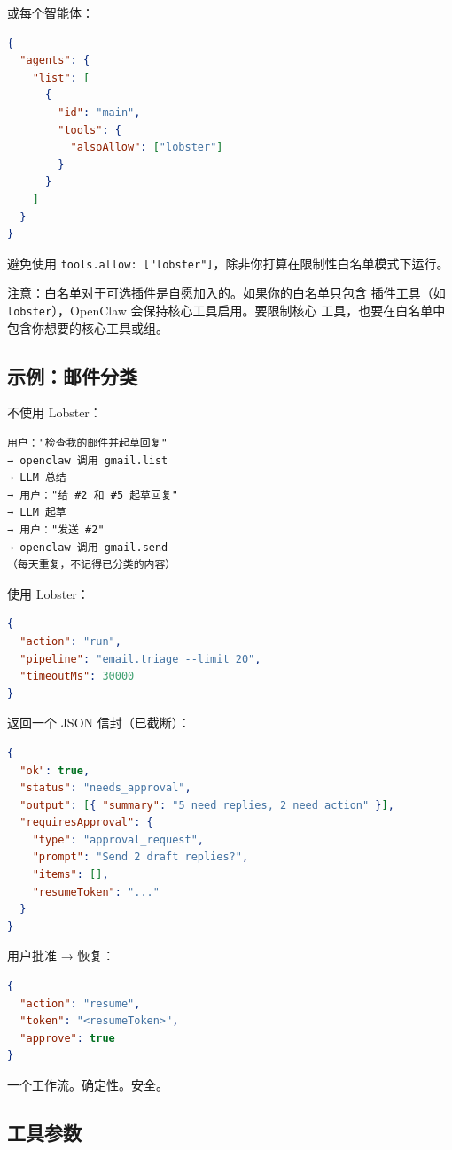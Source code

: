 或每个智能体：

\begin{lstlisting}[language=json]
{
  "agents": {
    "list": [
      {
        "id": "main",
        "tools": {
          "alsoAllow": ["lobster"]
        }
      }
    ]
  }
}
\end{lstlisting}


避免使用 \texttt{tools.allow: ["lobster"]}，除非你打算在限制性白名单模式下运行。

注意：白名单对于可选插件是自愿加入的。如果你的白名单只包含
插件工具（如 \texttt{lobster}），OpenClaw 会保持核心工具启用。要限制核心
工具，也要在白名单中包含你想要的核心工具或组。

\subsection{示例：邮件分类}


不使用 Lobster：

\begin{lstlisting}
用户："检查我的邮件并起草回复"
→ openclaw 调用 gmail.list
→ LLM 总结
→ 用户："给 #2 和 #5 起草回复"
→ LLM 起草
→ 用户："发送 #2"
→ openclaw 调用 gmail.send
（每天重复，不记得已分类的内容）
\end{lstlisting}


使用 Lobster：

\begin{lstlisting}[language=json]
{
  "action": "run",
  "pipeline": "email.triage --limit 20",
  "timeoutMs": 30000
}
\end{lstlisting}


返回一个 JSON 信封（已截断）：

\begin{lstlisting}[language=json]
{
  "ok": true,
  "status": "needs_approval",
  "output": [{ "summary": "5 need replies, 2 need action" }],
  "requiresApproval": {
    "type": "approval_request",
    "prompt": "Send 2 draft replies?",
    "items": [],
    "resumeToken": "..."
  }
}
\end{lstlisting}


用户批准 → 恢复：

\begin{lstlisting}[language=json]
{
  "action": "resume",
  "token": "<resumeToken>",
  "approve": true
}
\end{lstlisting}


一个工作流。确定性。安全。

\subsection{工具参数}


